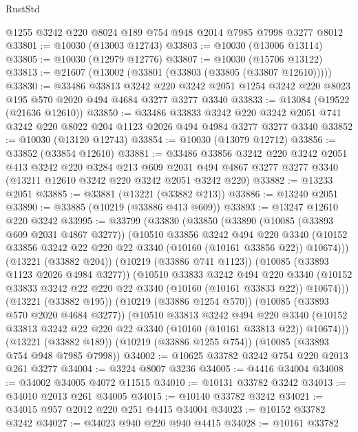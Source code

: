 \begin{lexlean}{RustStd}
\begin{coremodule}
    @1255
    @3242
    @220
    @8024
    @189
    @754
    @948
    @2014
    @7985
    @7998
    @3277
    @8012
@33801 := @10030 (@13003 @12743)
@33803 := @10030 (@13006 @13114)
@33805 := @10030 (@12979 @12776)
@33807 := @10030 (@15706 @13122)
@33813 := @21607 (@13002 (@33801 (@33803 (@33805 (@33807 @12610)))))
@33830 := @33486
    @33813
    @3242
    @220
    @3242
    @2051
    @1254
    @3242
    @220
    @8023
    @195
    @570
    @2020
    @494
    @4684
    @3277
    @3277
    @3340
@33833 := @13084 (@19522 (@21636 @12610))
@33850 := @33486
    @33833
    @3242
    @220
    @3242
    @2051
    @741
    @3242
    @220
    @8022
    @204
    @1123
    @2026
    @494
    @4984
    @3277
    @3277
    @3340
@33852 := @10030 (@13120 @12743)
@33854 := @10030 (@13079 @12712)
@33856 := @33852 (@33854 @12610)
@33881 := @33486
    @33856
    @3242
    @220
    @3242
    @2051
    @413
    @3242
    @220
    @3284
    @213
    @609
    @2031
    @494
    @4867
    @3277
    @3277
    @3340
    (@13211 @12610 @3242 @220 @3242 @2051 @3242 @220)
@33882 := @13233 @2051
@33885 := @33881 (@13221 (@33882 @213))
@33886 := @13240 @2051
@33890 := @33885 (@10219 (@33886 @413 @609))
@33893 := @13247 @12610 @220 @3242
@33995 := @33799
    (@33830
      (@33850
        (@33890
          (@10085 (@33893 @609 @2031 @4867 @3277))
          (@10510
            @33856
            @3242
            @494
            @220
            @3340
            (@10152 @33856 @3242 @22 @220 @22 @3340 (@10160 (@10161 @33856 @22)) @10674)))
        (@13221 (@33882 @204))
        (@10219 (@33886 @741 @1123))
        (@10085 (@33893 @1123 @2026 @4984 @3277))
        (@10510
          @33833
          @3242
          @494
          @220
          @3340
          (@10152 @33833 @3242 @22 @220 @22 @3340 (@10160 (@10161 @33833 @22)) @10674)))
      (@13221 (@33882 @195))
      (@10219 (@33886 @1254 @570))
      (@10085 (@33893 @570 @2020 @4684 @3277))
      (@10510
        @33813
        @3242
        @494
        @220
        @3340
        (@10152 @33813 @3242 @22 @220 @22 @3340 (@10160 (@10161 @33813 @22)) @10674)))
    (@13221 (@33882 @189))
    (@10219 (@33886 @1255 @754))
    (@10085 (@33893 @754 @948 @7985 @7998))
@34002 := @10625 @33782 @3242 @754 @220 @2013 @261 @3277
@34004 := @3224 @8007 @3236
@34005 := @4416 @34004
@34008 := @34002 @34005 @4072 @11515
@34010 := @10131 @33782 @3242
@34013 := @34010 @2013 @261 @34005
@34015 := @10140 @33782 @3242
@34021 := @34015 @957 @2012 @220 @251 @4415 @34004
@34023 := @10152 @33782 @3242
@34027 := @34023 @940 @220 @940 @4415
@34028 := @10161 @33782

\end{coremodule}
\end{lexlean}

